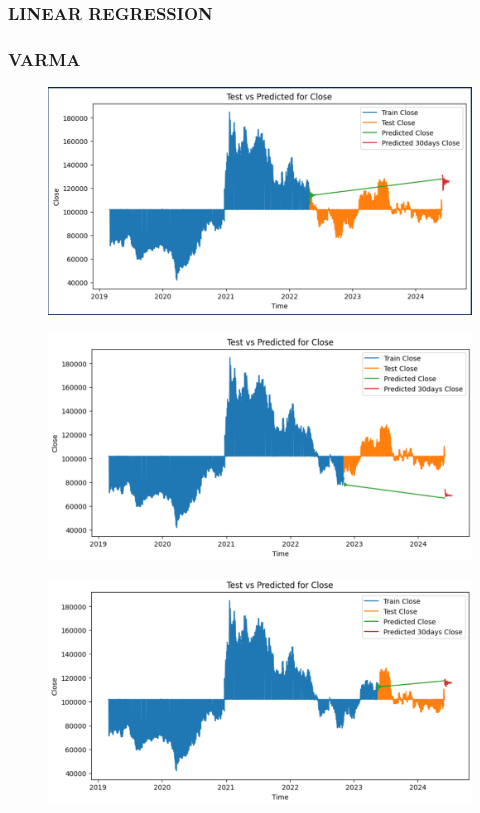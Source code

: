\documentclass{article}
\begin{document}
\begin{multicols}{2}
\subsubsection{LINEAR REGRESSION}

\subsubsection{VARMA}
\begin{figure}[H]
    \centering
    \begin{minipage}{0.15\textwidth}
    \centering
    \includegraphics[width=1\textwidth]{Image/VARMA/LG/6_4/30.png}
   
    \label{fig:1}
    \end{minipage}%
    \begin{minipage}{0.15\textwidth}
    \centering
    \includegraphics[width=1\textwidth]{Image/VARMA/LG/7_3/30.png}
  
    \label{fig:2}
    \end{minipage}%
    \begin{minipage}{0.15\textwidth}
    \centering
    \includegraphics[width=1\textwidth]{Image/VARMA/LG/8_2/30.png}


\end{minipage}
\end{figure}
\end{multicols}
\end{document}
